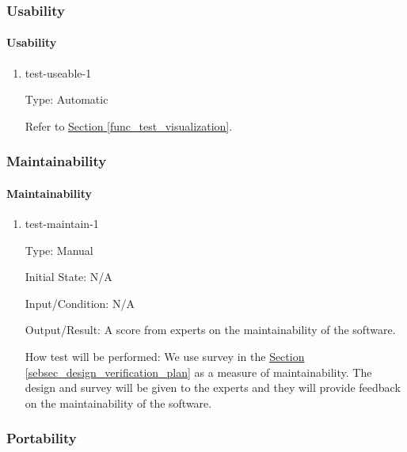 \documentclass[12pt, titlepage]{article}
\begin{document}
\subsubsection{Usability}

\paragraph{Usability}

\begin{enumerate}

\item{test-useable-1\\}

Type: Automatic

Refer to \hyperref[func_test_visualization]{Section \ref*{func_test_visualization}}.

\end{enumerate}

\subsubsection{Maintainability}

\paragraph{Maintainability}

\begin{enumerate}

\item{test-maintain-1\\}

Type: Manual
					
Initial State: N/A
					
Input/Condition: N/A
					
Output/Result: A score from experts on the maintainability of the software.
					
How test will be performed: We use survey in the 
\hyperref[sebsec_design_verification_plan]{Section \ref*{sebsec_design_verification_plan}} as 
a measure of maintainability. The design and survey will be given to the experts and 
they will provide feedback on the maintainability of the software.

\end{enumerate}

\subsubsection{Portability}
\end{document}
